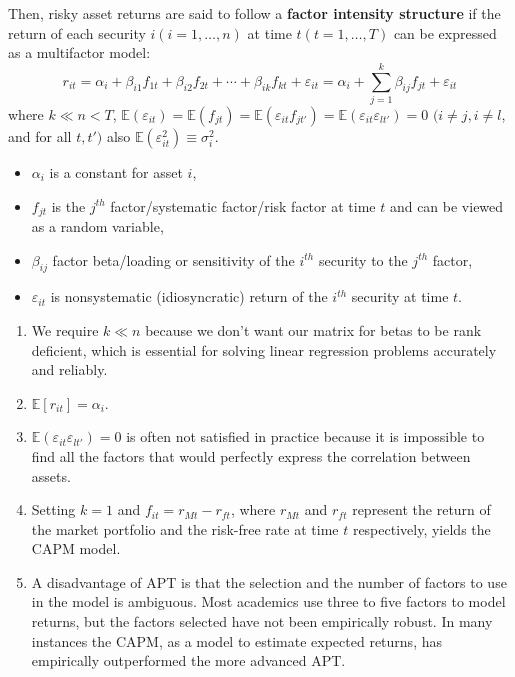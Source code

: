 \documentclass[13pt]{article}
\theoremstyle{definition}
\theoremstyle{remark}
\newenvironment{remark}
  {\pushQED{\qed}\renewcommand{\qedsymbol}{$\triangle$}\remarkx}
  {\popQED\endremarkx}
\begin{document}
    Then, risky asset returns are said to follow a \textbf{factor intensity structure} if the return of each security $i(i=1, \ldots, n)$ at time $t(t=1, \ldots, T)$ can be expressed as a multifactor model:
$$
r_{i t}=\alpha_i+\beta_{i 1} f_{1 t}+\beta_{i 2} f_{2 t}+\cdots+\beta_{i k} f_{k t}+\varepsilon_{i t}=\alpha_i+\sum_{j=1}^k \beta_{i j} f_{j t}+\varepsilon_{i t}
$$
where $k \ll n<T$, $
    \mathbb{E}\left(\varepsilon_{i t}\right)=\mathbb{E}\left(f_{j t}\right)=\mathbb{E}\left(\varepsilon_{i t} f_{j t'}\right)=\mathbb{E}\left(\varepsilon_{i t} \varepsilon_{l t'}\right)=0$ $(i \neq j, i \neq l$, and for all $t, t')$ also $\mathbb{E}\left(\varepsilon_{i t}^2\right) \equiv \sigma_i^2$.
\begin{itemize}
    \item $\alpha_i$ is a constant for asset $i$,
    \item $f_{j t}$ is the $j^{th}$ factor/systematic factor/risk factor at time $t$ and can be viewed as a random variable,
    \item $\beta_{i j}$ factor beta/loading or sensitivity of the $i^{th}$ security to the $j^{th}$ factor,
    \item $\varepsilon_{i t}$ is nonsystematic (idiosyncratic) return of the $i^{th}$ security at time $t$.
\end{itemize}
\begin{remark}
    \hfill
    \begin{enumerate}
        \item We require $k \ll n$ because we don't want our matrix for betas to be rank deficient, which is essential for solving linear regression problems accurately and reliably.
        \item $\mathbb{E}[r_{i t}]=\alpha_i$.
        \item $\mathbb{E}\left(\varepsilon_{i t} \varepsilon_{l t'}\right)=0$ is often not satisfied in practice because it is impossible to find all the factors that would perfectly express the correlation between assets.
        \item Setting $k=1$ and $f_{it}=r_{Mt}-r_{ft}$, where $r_{Mt}$ and $r_{ft}$ represent the return of the market portfolio and the risk-free rate at time $t$ respectively, yields the CAPM model.
        \item A disadvantage of APT is that the selection and the number of factors to use in the model is ambiguous. Most academics use three to five factors to model returns, but the factors selected have not been empirically robust. In many instances the CAPM, as a model to estimate expected returns, has empirically outperformed the more advanced APT.
    \end{enumerate}
\end{remark}
\end{document}
